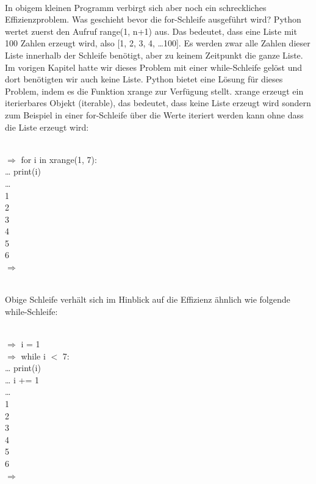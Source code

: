 \\
In obigem kleinen Programm verbirgt sich aber noch ein schreckliches Effizienzproblem. Was geschieht bevor die for-Schleife ausgeführt wird? Python wertet zuerst den Aufruf range(1, n+1) aus. Das bedeutet, dass eine Liste mit 100 Zahlen erzeugt wird, also [1, 2, 3, 4, \dots 100]. Es werden zwar alle Zahlen dieser Liste innerhalb der Schleife benötigt, aber zu keinem Zeitpunkt die ganze Liste. Im vorigen Kapitel hatte wir dieses Problem mit einer while-Schleife gelöst und dort benötigten wir auch keine Liste. Python bietet eine Lösung für dieses Problem, indem es die Funktion xrange zur Verfügung stellt. xrange erzeugt ein iterierbares Objekt (iterable), das bedeutet, dass keine Liste erzeugt wird sondern zum Beispiel in einer for-Schleife über die Werte iteriert werden kann ohne dass die Liste erzeugt wird: \\
\\
\begin{MyConsoleBox}{
${\Longrightarrow}$ for i in xrange(1, 7): \\
\dots \hspace{0.5cm}     print(i) \\
\dots \hspace{0.5cm} \\
1 \\
2 \\
3 \\
4 \\
5 \\
6 \\
${\Longrightarrow}$ \\
}\end{MyConsoleBox}
\\
Obige Schleife verhält sich im Hinblick auf die Effizienz ähnlich wie folgende while-Schleife: \\
\\
\begin{MyConsoleBox}{
${\Longrightarrow}$ i = 1 \\
${\Longrightarrow}$ while i $<$ 7: \\
\dots\hspace{0.5cm}     print(i) \\
\dots\hspace{0.5cm}     i += 1 \\
\dots\hspace{0.5cm} \\
1 \\
2 \\
3 \\
4 \\
5 \\
6 \\
${\Longrightarrow}$ \\
}\end{MyConsoleBox}
